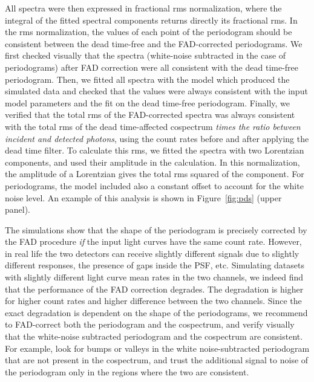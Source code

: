 \documentclass[twocolumn]{aastex61}
\begin{document}
All spectra were then expressed in fractional rms \citep{BelloniHasinger90,Miyamoto+91} normalization, where the integral of the fitted spectral components returns directly its fractional rms.
In the rms normalization, the values of each point of the periodogram should be consistent between the dead time-free and the FAD-corrected periodograms.
We first checked visually that the spectra (white-noise subtracted in the case of periodograms) after FAD correction were all consistent with the dead time-free periodogram. 
Then, we fitted all spectra with the model which produced the simulated data and checked that the values were always consistent with the input model parameters and the fit on the dead time-free periodogram.
Finally, we verified that the total rms of the FAD-corrected spectra was always consistent with the total rms of the dead time-affected cospectrum \textit{times the ratio between incident and detected photons}, using the count rates before and after applying the dead time filter.
To calculate this rms, we fitted the spectra with two Lorentzian components, and used their amplitude in the calculation.
In this normalization, the amplitude of a Lorentzian gives the total rms squared of the component.
For periodograms, the model included also a constant offset to account for the white noise level.
An example of this analysis is shown in Figure~\ref{fig:pds} (upper panel).

The simulations show that the shape of the periodogram is precisely corrected by the FAD procedure \textit{if} the input light curves have the same count rate. 
However, in real life the two detectors can receive slightly different signals due to slightly different responses, the presence of gaps inside the PSF, etc.
Simulating datasets with slightly different light curve mean rates in the two channels, we indeed find that the performance of the FAD correction degrades.
The degradation is higher for higher count rates and higher difference between the two channels. 
Since the exact degradation is dependent on the shape of the periodograms, we recommend to FAD-correct both the periodogram and the cospectrum, and verify visually that the white-noise subtracted periodogram and the cospectrum are consistent.
For example, look for bumps or valleys in the white noise-subtracted periodogram that are not present in the cospectrum, and
trust the additional signal to noise of the periodogram only in the regions where the two are consistent.
\end{document}
